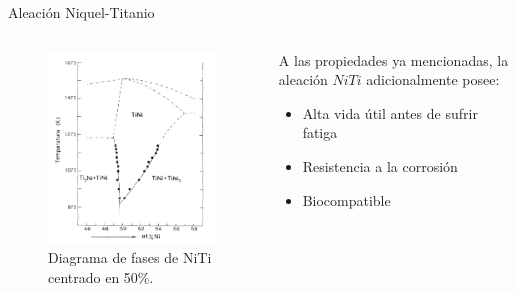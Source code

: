 \documentclass[11pt]{beamer}
\begin{document}
		\begin{frame}{Aleación Niquel-Titanio}
			\begin{columns}[T]
				\begin{column}{.49\textwidth}
					\begin{figure}[H]
					\centering
					\includegraphics[scale=0.25]{img/NiTiphasediagram.png}
					\caption{Diagrama de fases de NiTi centrado en 50\%.}
					\end{figure}
				\end{column}
				\begin{column}{.49\textwidth}
				A las propiedades ya mencionadas, la aleación $NiTi$ adicionalmente posee:
					\begin{itemize}
						\item Alta vida útil antes de sufrir fatiga
						\item Resistencia a la corrosión
						\item Biocompatible
					\end{itemize}
				\end{column}
			\end{columns}
		\end{frame}
		
\end{document}
